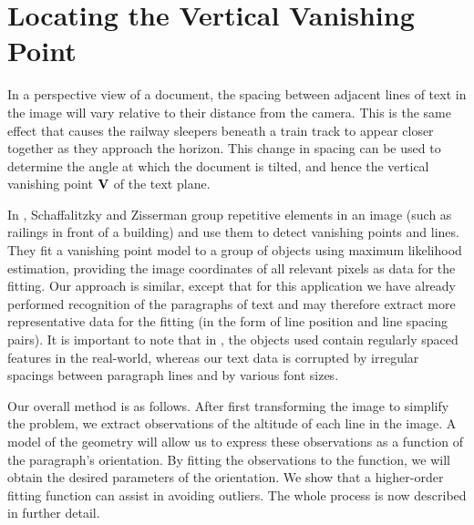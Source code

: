 
\section{Locating the Vertical Vanishing Point} \label{sec-vertvanish}


In a perspective view of a document, the spacing between adjacent lines of text
in the image will vary relative to their distance from the camera.  This is the
same effect that causes the railway sleepers beneath a train track to appear
closer together as they approach the horizon. This change in spacing can be used
to determine the angle at which the document is tilted, and hence the vertical
vanishing point ${ \bf V }$ of the text plane. 

In \cite{planargrouping}, Schaffalitzky and Zisserman group repetitive elements
in an image (such as railings in front of a building) and use them to detect 
vanishing points and lines. 
They fit a vanishing point model to a group of objects using maximum likelihood
estimation, providing the image coordinates of all relevant pixels as data for
the fitting. Our approach is similar, except that for this application we have 
already performed recognition of the paragraphs of text and may therefore 
extract more representative data for the fitting
(in the form of line position and line spacing pairs).
It is important to
note that in \cite{planargrouping}, the objects used contain regularly spaced
features in the real-world, whereas our text data is corrupted by irregular
spacings between paragraph lines and by various font sizes.


Our overall method is as follows. After first transforming the image to 
simplify the problem, we  extract observations of the altitude of 
each line in the image.  A model of the geometry will allow us to express 
these observations as a function of the paragraph's orientation.  By 
fitting the observations to the function, we will obtain the desired 
parameters of the orientation.  We show that a higher-order fitting function 
can assist in avoiding outliers. The whole process is now described in
further detail.

